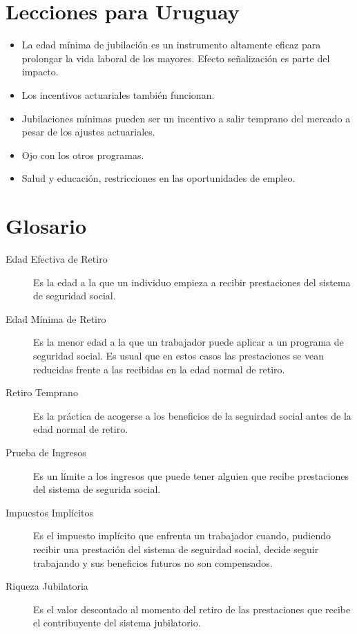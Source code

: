 \documentclass[]{article}
\providecommand{\tightlist}{%
  \setlength{\itemsep}{0pt}\setlength{\parskip}{0pt}}
\begin{document}
\section{Lecciones para Uruguay}\label{lecciones-para-uruguay}

\begin{itemize}
\tightlist
\item
  La edad mínima de jubilación es un instrumento altamente eficaz para
  prolongar la vida laboral de los mayores. Efecto señalización es parte
  del impacto.
\item
  Los incentivos actuariales también funcionan.
\item
  Jubilaciones mínimas pueden ser un incentivo a salir temprano del
  mercado a pesar de los ajustes actuariales.
\item
  Ojo con los otros programas.
\item
  Salud y educación, restricciones en las oportunidades de empleo.
\end{itemize}

\section{Glosario}\label{glosario}

\begin{description}
\item[Edad Efectiva de Retiro]
Es la edad a la que un individuo empieza a recibir prestaciones del
sistema de seguridad social.
\item[Edad Mínima de Retiro]
Es la menor edad a la que un trabajador puede aplicar a un programa de
seguridad social. Es usual que en estos casos las prestaciones se vean
reducidas frente a las recibidas en la edad normal de retiro.
\item[Retiro Temprano]
Es la práctica de acogerse a los beneficios de la seguirdad social antes
de la edad normal de retiro.
\item[Prueba de Ingresos]
Es un límite a los ingresos que puede tener alguien que recibe
prestaciones del sistema de segurida social.
\item[Impuestos Implícitos]
Es el impuesto implícito que enfrenta un trabajador cuando, pudiendo
recibir una prestación del sistema de seguirdad social, decide seguir
trabajando y sus beneficios futuros no son compensados.
\item[Riqueza Jubilatoria]
Es el valor descontado al momento del retiro de las prestaciones que
recibe el contribuyente del sistema jubilatorio.
\end{description}
\end{document}
